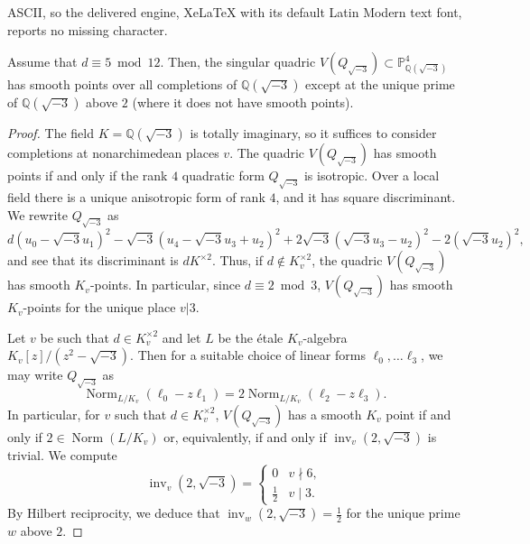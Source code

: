 \documentclass[10pt,a4paper]{amsart}
\DeclareMathOperator{\Norm}{Norm}
\DeclareMathOperator{\inv}{inv}
\newcommand{\PP}{{\mathbb P}}
\newcommand{\Q}{{\mathbb Q}}
\begin{document}
ASCII, so the delivered engine, XeLaTeX with its default Latin Modern text font, reports no missing character.
\begin{lemma}\label{lem:compare}
	Assume that \(d\equiv 5 \bmod 12\). Then, the singular quadric $V(Q_{\sqrt{-3}}) \subset \PP^4_{\Q({\sqrt{-3}})}$ has smooth points over all completions of $\Q({\sqrt{-3}})$ except at the unique prime of $\Q({\sqrt{-3}})$ above $2$ (where it does not have smooth points).
\end{lemma}	

\begin{proof}
   The field \(K= \Q({\sqrt{-3}})\) is totally imaginary, so it suffices to consider completions at nonarchimedean places \(v\).
	The quadric $V(Q_{\sqrt{-3}})$ has smooth points if and only if the rank $4$ quadratic form $Q_{\sqrt{-3}}$ is isotropic. Over a local field there is a unique anisotropic form of rank $4$, and it has square discriminant.
   We rewrite \(Q_{{\sqrt{-3}}}\) as
   \[
      d(u_0 - {\sqrt{-3}} u_1)^2 - {\sqrt{-3}}\left(u_4 -{\sqrt{-3}} u_3 + u_2\right)^2 + 2{\sqrt{-3}}\left({\sqrt{-3}} u_3 - u_2\right)^2 - 2({\sqrt{-3}} u_2)^2,
   \]
   and see that its discriminant is \(dK^{\times2}\). Thus, if \(d\not\in K_v^{\times2}\), the quadric \(V(Q_{{\sqrt{-3}}})\) has smooth \(K_v\)-points.  In particular, since \(d\equiv 2 \bmod 3\), \(V(Q_{{\sqrt{-3}}})\) has smooth \(K_v\)-points for the unique place \(v|3\).
   
   Let \(v\) be such that \(d \in K_v^{\times 2}\) and let \(L\) be the \'etale $K_v$-algebra \(K_v[z]/(z^2 - {\sqrt{-3}})\). Then for a suitable choice of linear forms \(\ell_0, \dots \ell_3\), we may write \(Q_{{\sqrt{-3}}}\) as
   \[
      \Norm_{L/K_v}(\ell_0 - {z}\ell_1) = 2\Norm_{L/K_v}(\ell_2 -{z}\ell_3).
   \]
   In particular, for $v$ such that \(d\in K_v^{\times2}\), \(V(Q_{{\sqrt{-3}}})\) has a smooth \(K_v\) point if and only if \(2 \in \Norm(L/K_v)\) or, equivalently, if and only if \({\inv_v}(2, {\sqrt{-3}})\) is trivial. We compute
   \[
      {\inv_v}(2,{\sqrt{-3}}) = \begin{cases}
         0 & v\nmid 6,\\
         \frac12 & v \mid 3.
      \end{cases}
   \]
   By Hilbert reciprocity, we deduce that \(\inv_w(2,{\sqrt{-3}}) = \frac12\) for the unique prime $w$ above $2$.
   \end{proof}
\end{document}
